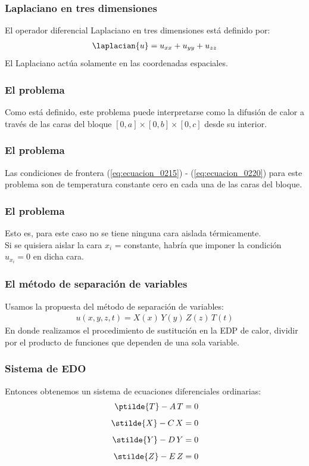 \begin{frame}
\frametitle{Laplaciano en tres dimensiones}
El operador diferencial Laplaciano en tres dimensiones está definido por:
\begin{align}
\laplacian{u} = u_{xx} +u_{yy} + u_{zz}
\end{align}
El Laplaciano actúa solamente en las coordenadas espaciales.
\end{frame}
\begin{frame}
\frametitle{El problema}
Como está definido, este problema puede interpretarse como la difusión de calor a través de las caras del bloque $[0, a] \times [0, b] \times [0,c]$ desde su interior.
\end{frame}
\begin{frame}
\frametitle{El problema}
Las condiciones de frontera (\ref{eq:ecuacion_0215}) - (\ref{eq:ecuacion_0220}) para este problema son de temperatura constante cero en cada una de las caras del bloque.
\end{frame}
\begin{frame}
\frametitle{El problema}
Esto es, para este caso no se tiene ninguna cara aislada térmicamente.
\\
\bigskip
Si se quisiera aislar la cara $x_{i}$ = constante, habría que imponer la condición $u_{x_{i}} = 0$ en dicha cara.
\end{frame}
\begin{frame}
\frametitle{El método de separación de variables}
Usamos la propuesta del método de separación de variables:
\begin{align}
u(x, y, z, t) = X(x) \, Y(y) \, Z(z) \, T(t)
\label{eq:ecuacion_02_223}
\end{align}
\pause
En donde realizamos el procedimiento de sustitución en la EDP de calor, dividir por el producto de funciones que dependen de una sola variable.
\end{frame}
\begin{frame}
\frametitle{Sistema de EDO}
Entonces obtenemos un sistema de ecuaciones diferenciales ordinarias:
\begin{align}
\ptilde{T} - A \, T &= 0 \label{eq:ecuacion_02_224} \\[0.5em]
\stilde{X} - C \, X &= 0 \label{eq:ecuacion_02_225} \\[0.5em]
\stilde{Y} - D \, Y &= 0 \label{eq:ecuacion_02_226} \\[0.5em]
\stilde{Z} - E \, Z &= 0 \label{eq:ecuacion_02_227} \end{align}
\end{frame}
